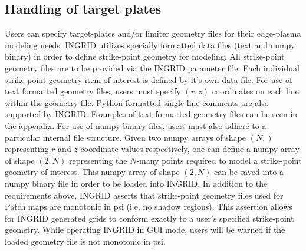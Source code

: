 \subsection{Handling of target plates}
Users can specify target-plates and/or limiter geometry files for their edge-plasma modeling needs. INGRID utilizes specially formatted data files (text and numpy binary) in order to define strike-point geometry for modeling. All strike-point geometry files are to be provided via the INGRID parameter file. Each individual strike-point geometry item of interest is defined by it's own data file.
For use of text formatted geometry files, users must specify $(r,z)$ coordinates on each line within the geometry file. Python formatted single-line comments are also supported by INGRID. Examples of text formatted geometry files can be seen in the appendix. 
For use of numpy-binary files, users must also adhere to a particular internal file structure. Given two numpy arrays of shape $(N, )$ representing $r$ and $z$ coordinate values respectively, one can define a numpy array of shape $(2,N)$ representing the $N$-many points required to model a strike-point geometry of interest. This numpy array of shape $(2, N)$ can be saved into a numpy binary file in order to be loaded into INGRID.
In addition to the requirements above, INGRID asserts that strike-point geometry files used for Patch maps are monotonic in psi (i.e. no shadow regions). This assertion allows for INGRID generated grids to conform exactly to a user's specified strike-point geometry. While operating INGRID in GUI mode, users will be warned if the loaded geometry file is not monotonic in psi. 